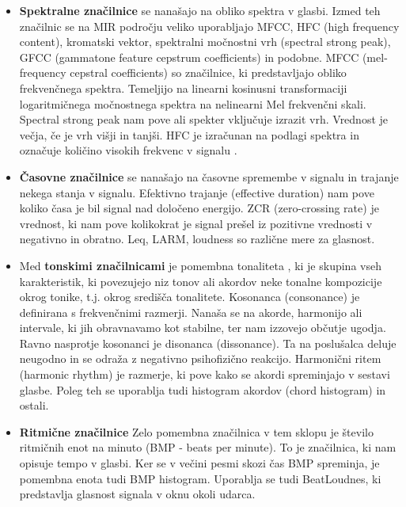 \documentclass[a4paper, 12pt]{book}
\begin{document}
{\begin{itemize}
  \item \textbf{Spektralne značilnice} se nanašajo na obliko spektra v glasbi. Izmed teh značilnic se na MIR področju veliko uporabljajo MFCC, HFC (high frequency content), kromatski vektor, spektralni močnostni vrh (spectral strong peak), GFCC (gammatone feature cepstrum coefficients) in podobne. 
MFCC (mel-frequency cepstral coefficients) \cite{lawrence2008fundamentals} so značilnice, ki predstavljajo obliko frekvenčnega spektra. Temeljijo na linearni kosinusni transformaciji logaritmičnega močnostnega spektra na nelinearni Mel frekvenčni skali. Spectral strong peak \cite{gouyon2001exploration} nam pove ali spekter vključuje izrazit vrh. Vrednost je večja, če je vrh višji in tanjši. HFC je izračunan na podlagi spektra in označuje količino visokih frekvenc v signalu \cite{brossier2004real}.

  \item \textbf{Časovne značilnice} se nanašajo na časovne spremembe v signalu in trajanje nekega stanja v signalu. Efektivno trajanje (effective duration) nam pove koliko časa je bil signal nad določeno energijo. ZCR (zero-crossing rate) \cite{gouyon2000classifying} je vrednost, ki nam pove kolikokrat je signal prešel iz pozitivne vrednosti v negativno in obratno. Leq, LARM, loudness so različne mere za glasnost. 
  
  \item Med \textbf{tonskimi značilnicami} je pomembna tonaliteta \cite{zhu2005music}, ki je skupina vseh karakteristik, ki povezujejo niz tonov ali akordov neke tonalne kompozicije okrog tonike, t.j. okrog središča tonalitete. Kosonanca  (consonance) \cite{terhardt1974pitch} je definirana s frekvenčnimi razmerji. Nanaša se na akorde, harmonijo ali intervale, ki jih obravnavamo kot stabilne, ter nam izzovejo občutje ugodja. Ravno nasprotje kosonanci je disonanca (dissonance). Ta na poslušalca deluje neugodno in se odraža z negativno psihofizično reakcijo. Harmonični ritem (harmonic rhythm) \cite{la2001harmonic} je razmerje, ki pove kako se akordi spreminjajo v sestavi glasbe. Poleg teh se uporablja tudi histogram akordov (chord histogram) in ostali.
  
  \item \textbf{Ritmične značilnice} Zelo pomembna značilnica v tem sklopu je število ritmičnih enot na minuto (BMP - beats per minute). To je značilnica, ki nam opisuje tempo v glasbi. Ker se v večini pesmi skozi čas BMP spreminja, je pomembna enota tudi BMP histogram. Uporablja se tudi BeatLoudnes, ki predstavlja glasnost signala v oknu okoli udarca. 
  

\end{itemize}}
\end{document}
